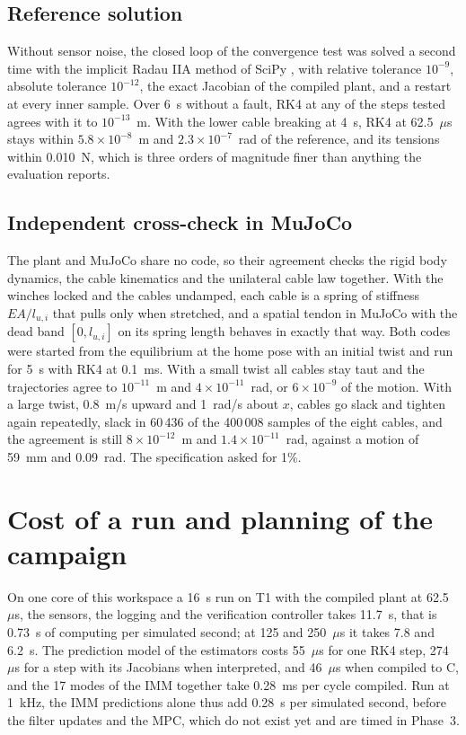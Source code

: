 \documentclass[10pt]{article}
\begin{document}
\subsection{Reference solution}

Without sensor noise, the closed loop of the convergence test was solved a second time with the implicit Radau IIA method \citep{hairer1996stiff} of SciPy \citep{virtanen2020scipy}, with relative tolerance $10^{-9}$, absolute tolerance $10^{-12}$, the exact Jacobian of the compiled plant, and a restart at every inner sample. Over 6~s without a fault, RK4 at any of the steps tested agrees with it to $10^{-13}$~m. With the lower cable breaking at 4~s, RK4 at 62.5~$\mu$s stays within $5.8\times10^{-8}$~m and $2.3\times10^{-7}$~rad of the reference, and its tensions within 0.010~N, which is three orders of magnitude finer than anything the evaluation reports.

\subsection{Independent cross-check in MuJoCo}

The plant and MuJoCo \citep{todorov2012mujoco} share no code, so their agreement checks the rigid body dynamics, the cable kinematics and the unilateral cable law together. With the winches locked and the cables undamped, each cable is a spring of stiffness $EA/l_{u,i}$ that pulls only when stretched, and a spatial tendon in MuJoCo with the dead band $[0,l_{u,i}]$ on its spring length behaves in exactly that way. Both codes were started from the equilibrium at the home pose with an initial twist and run for 5~s with RK4 at 0.1~ms. With a small twist all cables stay taut and the trajectories agree to $10^{-11}$~m and $4\times10^{-11}$~rad, or $6\times10^{-9}$ of the motion. With a large twist, 0.8~m/s upward and 1~rad/s about $x$, cables go slack and tighten again repeatedly, slack in 60\,436 of the 400\,008 samples of the eight cables, and the agreement is still $8\times10^{-12}$~m and $1.4\times10^{-11}$~rad, against a motion of 59~mm and 0.09~rad. The specification asked for 1\%.

\section{Cost of a run and planning of the campaign}\label{sec:cost}

On one core of this workspace a 16~s run on T1 with the compiled plant at 62.5~$\mu$s, the sensors, the logging and the verification controller takes 11.7~s, that is 0.73~s of computing per simulated second; at 125 and 250~$\mu$s it takes 7.8 and 6.2~s. The prediction model of the estimators costs 55~$\mu$s for one RK4 step, 274~$\mu$s for a step with its Jacobians when interpreted, and 46~$\mu$s when compiled to C, and the 17 modes of the IMM together take 0.28~ms per cycle compiled. Run at 1~kHz, the IMM predictions alone thus add 0.28~s per simulated second, before the filter updates and the MPC, which do not exist yet and are timed in Phase~3.
\end{document}
